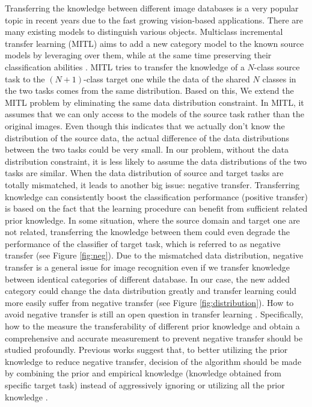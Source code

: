 Transferring the knowledge between different image databases is a very popular topic in recent years due to the fast growing vision-based applications. There are many existing models to distinguish various objects. Multiclass incremental transfer learning (MITL) aims to add a new category model to the known source models by leveraging over them, while at the same time preserving their classification abilities \cite{kuzborskij2013n}. MITL tries to transfer the knowledge of a $N$-class source task to the $(N+1)$-class target one while the data of the shared $N$ classes in the two tasks comes from the same distribution.
Based on this, We extend the MITL problem by eliminating the same data distribution constraint. 
In MITL, it assumes that we can only access to the models of the source task rather than the original images. Even though this indicates that we actually don't know the distribution of the source data, the actual difference of the data distributions between the two tasks could be very small. In our problem, without the data distribution constraint, it is less likely to assume the data distributions of the two tasks are similar. When the data distribution of source and target tasks are totally mismatched, it leads to another big issue: negative transfer. 
Transferring knowledge can consistently boost the classification performance (positive transfer) is based on the fact that the learning procedure can benefit from sufficient related prior knowledge. In some situation, where the source domain and target one are not related, transferring the knowledge between them could even degrade the performance of the classifier of target task, which is referred to as negative transfer (see Figure \ref{fig:neg}). 
Due to the mismatched data distribution, negative transfer is a general issue for image recognition even if we transfer knowledge between identical categories of different database. In our case, the new added category could change the data distribution greatly and transfer learning could more easily suffer from negative transfer (see Figure \ref{fig:distribution}). 
How to avoid negative transfer is still an open question in transfer learning \cite{Lu201514}. Specifically, how to the measure the transferability of different prior knowledge and obtain a comprehensive and accurate measurement to prevent negative transfer should be studied profoundly. Previous works suggest that, to better utilizing the prior knowledge to reduce negative transfer, decision of the algorithm should be made by combining the prior and empirical knowledge (knowledge obtained from specific target task) instead of aggressively ignoring or utilizing all the prior knowledge \cite{tommasi2014learning} \cite{kuzborskij2013n} \cite{yang2007cross} \cite{aytar2011tabula}.

